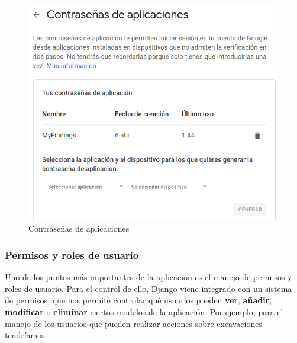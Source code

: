     \begin{figure}[H]
        \centering
        \includegraphics[scale=0.50]{imagenes/apps-pass.png}
        \caption{Contraseñas de aplicaciones}
        \label{fig:apps-pass}
    \end{figure}

\subsubsection{Permisos y roles de usuario}
Uno de los puntos más importantes de la aplicación es el manejo de permisos y roles de
usuario. Para el control de ello, Django viene integrado con un sistema de permisos,
que nos permite controlar qué usuarios pueden \textbf{ver}, \textbf{añadir}, \textbf{
modificar} o \textbf{eliminar} ciertos modelos de la aplicación. Por ejemplo, para el
manejo de los usuarios que pueden realizar acciones sobre excavaciones tendríamos:

